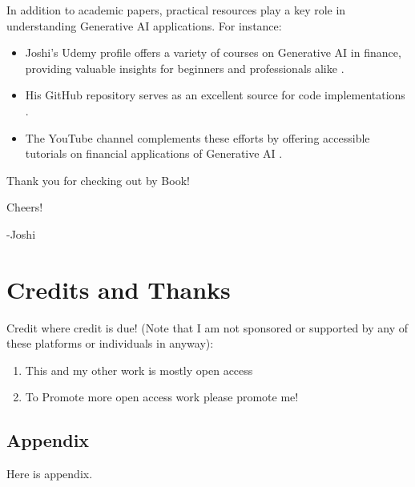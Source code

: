 \documentclass[a4paper,headinclude=on,footinclude=on,12pt,oneside]{scrbook}
\begin{document}
	
	In addition to academic papers, practical resources play a key role in understanding Generative AI applications. For instance:
	\begin{itemize}
		\item Joshi’s Udemy profile offers a variety of courses on Generative AI in finance, providing valuable insights for beginners and professionals alike \cite{JoshiUdemy2025}.
		\item His GitHub repository serves as an excellent source for code implementations \cite{JoshiGit2025}.
		\item The YouTube channel complements these efforts by offering accessible tutorials on financial applications of Generative AI \cite{JoshiYouTube2025}.
	\end{itemize}
	
	
	
	Thank you for checking out by Book!
	
	Cheers! \beers
	
	-Joshi
	
	\chapter*{Credits and Thanks}
	
	Credit where credit is due! (Note that I am not sponsored or supported by any of these platforms or individuals in anyway):
	
	\begin{enumerate}
		\item This and my other work is mostly open access
		\item To Promote more open access work please promote me!
		
	\end{enumerate}
	
	\begin{appendices}
		
		\chapter*{Appendix }
		
		Here is appendix.
		
		
		
	\end{appendices}
	
	\printindex
	
\end{document}
